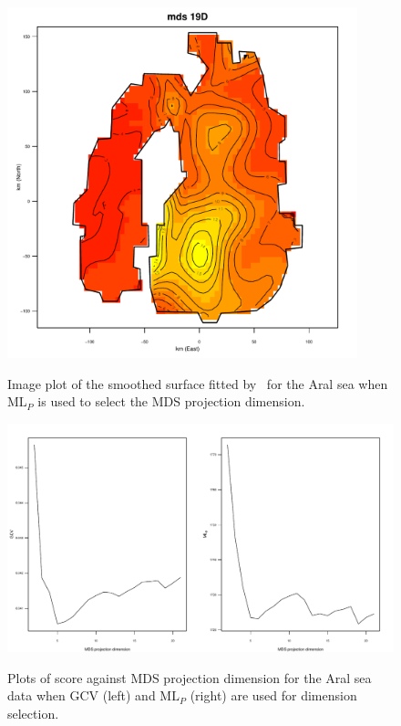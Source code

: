 \begin{figure}
\centering
\includegraphics[width=4in]{gds/figs/aral-19d.pdf} \\
\caption{Image plot of the smoothed surface fitted by \mdsds\ for the Aral sea when $\text{ML}_P$ is used to select the MDS projection dimension.}
\label{gds-aral-19d}
\end{figure}

\begin{figure}
\centering
\includegraphics[width=6in]{gds/figs/aral-dim-scores.pdf} \\
\caption{Plots of score against MDS projection dimension for the Aral sea data when GCV (left) and $\text{ML}_P$ (right) are used for dimension selection.}
\label{gds-aral-dim-select}
\end{figure}

